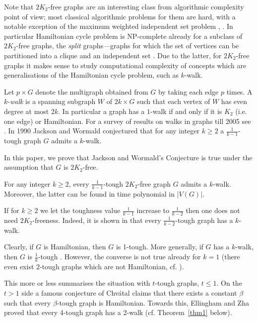 \documentclass[runningheads,a4paper]{llncs}
\begin{document}
Note that $2K_2$-free graphs are an interesting
class from algorithmic complexity point of view; most classical algorithmic problems for them are
hard, with a notable exception of the maximum weighted independent set problem
\cite{balasyu1989}, \cite[Graphclass: $2K_2$-free]{isgci}. In particular
Hamiltonian cycle problem is NP-complete already for a subclass of $2K_2$-free graphs,
the {\em split} graphs---graphs for which the set of vertices can be partitioned into
a clique and an independent set \cite[Exercise 6.2]{Golum}.
Due to the latter,  for $2K_2$-free graphs it makes sense to study computational complexity
of concepts which are generalisations of the Hamiltonian cycle
problem, such as $k$-walk.

Let $p\times G$ denote the multigraph obtained from $G$ by taking each edge $p$ times.
A $k$-{\em walk} is a spanning subgraph $W$ of $2k\times G$ such that each vertex of $W$
has even degree at most $2k$. %
In particular a graph has a $1$-walk if and only if it is $K_2$ (i.e. one edge) or Hamiltonian.
{For a survey of results on walks in graphs till 2005 see \cite{kouider2005connected}.}
In 1990 Jackson and Wormald conjectured \cite{jackson1990k} that for any integer $k\ge2$ a
$\frac{1}{k-1}$-tough graph $G$ admits a $k$-walk.

In this paper, we prove that Jackson and Wormald's Conjecture is true under the
assumption that $G$ is  $2K_2$-free.

\begin{theorem}\label{thm2}
For any integer $k\ge2$, every $\frac{1}{k-1}$-tough $2K_2$-free graph $G$
admits a $k$-walk.
Moreover, the latter can be found in time polynomial in $|V(G)|$.
\end{theorem}

If for $k\geq 2$ we let the toughness value $\frac{1}{k-1}$ increase to
$\frac{1}{k-2}$ then
one does not need $2K_2$-freeness. Indeed, it is shown in
\cite{jackson1990k} that
every $\frac{1}{k-2}$-tough graph has a $k$-walk.

Clearly, if $G$ is
Hamiltonian, then $G$ is 1-tough.  More generally,
if $G$ has a $k$-walk, then $G$ is $\frac{1}{k}$-tough \cite{jackson1990k}.
However, the converse is not true already for $k=1$ (there even exist $2$-tough graphs which are
not Hamiltonian, cf. \cite{bauer2000not}).

This more or less summarises the situation with $t$-tough graphs, $t\leq 1$.
On the $t>1$ side
a famous conjecture of Chv\'{a}tal \cite{chvatal1973tough} claims
that there exists a constant $\beta$ such that every
$\beta$-tough graph is Hamiltonian.
Towards this,
Ellingham and Zha \cite{ellingham2000toughness} proved that
every 4-tough graph has a 2-walk (cf. Theorem~\ref{thm1} below).
\end{document}

